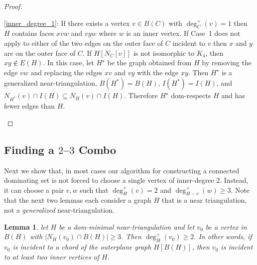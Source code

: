 \documentclass{article}
\newcommand{\pat}[1]{\textcolor{red}{PM: #1}}
\newcommand{\hussein}[1]{\textcolor{purple}{HH: #1}}
\newtheorem{lem}{Lemma}
\theoremstyle{definition}
\begin{document}
\begin{proof}
\begin{compactenum}
    \item \cref{inner_degree_1}: If there exists a vertex $v\in B(C)$ with $\deg^+_C(v)=1$ then $H$ contains faces $xvw$ and $vyw$ where $w$ is an inner vertex.  If Case~1 does not apply to either of the two edges on the outer face of $C$ incident to $v$ then $x$ and $y$ are on the outer face of $C$. If $H[N_C[v]]$ is not isomorphic to $K_4$, then $xy\not\in E(H)$.  In this case, let $H^\star$ be the graph obtained from $H$ by removing the edge $vw$ and replacing the edges $xv$ and $vy$ with the edge $xy$. Then $H^\star$ is a generalized near-triangulation, $B(H^*)=B(H)$, $I(H^*)=I(H)$, and $N_{H^*}(v)\cap I(H)\subseteq N_{H}(v)\cap I(H)$.  Therefore $H^\star$ dom-respects $H$ and has fewer edges than $H$. \qedhere

  \end{compactenum}
\end{proof}

\subsection{Finding a $2$--$3$ Combo}
\label{combo}

Next we show that, in most cases our algorithm for constructing a connected dominating set is not forced to choose a single vertex of inner-degree $2$. Instead, it can choose a pair $v,w$ such that $\deg^+_H(v)=2$ and $\deg^+_{H-v}(w)\ge 3$. Note that the next two lemmas each consider a graph $H$ that is a near triangulation, not a \emph{generalized} near-triangulation.

\begin{lem}\label{chord_incident}
  let $H$ be a dom-minimal near-triangulation and let $v_0$ be a vertex in $B(H)$ with $|N_H(v_0)\cap B(H)|\ge 3$.  Then $\deg^+_H(v_0)\ge 2$.  In other words, if $v_0$ is incident to a chord of the outerplane graph $H[B(H)]$, then $v_0$ is incident to at least two inner vertices of $H$.
\end{lem}
\end{document}
